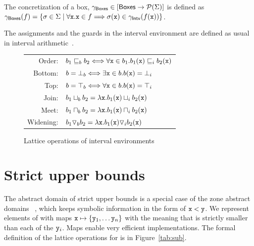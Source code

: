 \documentclass{elsart}
\begin{document}
The concretization of a box, $\gamma_{\mathsf{Boxes}} \in [\mathsf{Boxes} \rightarrow\mathcal{P}{(\Sigma)}]$ is defined as $\gamma_{\mathsf{Boxes}}(f) = \{ \sigma \in \Sigma \mid \forall \mathtt{x}. \mathtt{x} \in f \Longrightarrow \sigma(\mathtt{x}) \in \gamma_{\mathsf{Intv}}(f(\mathtt{x}))\}$.

The assignments and the guards in the interval environment are defined as usual in interval arithmetic~\cite{Cousot98}.

\begin{figure}
\small
\begin{tabular}{rl}
Order:& $ b_1 \sqsubseteq_b b_2 \Longleftrightarrow \forall \mathtt{x} \in b_1. b_1(\mathtt{x}) \sqsubseteq_i b_2(\mathtt{x})$ \\
Bottom:& $ b = {\bot}_b \Longleftrightarrow \exists \mathtt{x} \in b. b(\mathtt{x}) = {\bot}_i$ \\
Top:& $ b = {\top}_b \Longleftrightarrow \forall \mathtt{x} \in b. b(\mathtt{x}) = {\top}_i$\\
Join:& $ b_1 \sqcup_b b_2 = \lambda \mathtt{x}. b_1(\mathtt{x}) \sqcup_i b_2(\mathtt{x}) $ \\
Meet:& $ b_1 \sqcap_b b_2 = \lambda \mathtt{x}. b_1(\mathtt{x}) \sqcap_i b_2(\mathtt{x}) $  \\
Widening:&  $b_1 \triangledown_b b_2 = \lambda \mathtt{x}. b_1(\mathtt{x}) \triangledown_i b_2(\mathtt{x}) $
\end{tabular}
\caption{Lattice operations of interval environments}
\label{tab:boxes}
\end{figure}
 

\section{Strict upper bounds}
The abstract domain of strict upper bounds \SUB{} is a special case of
the zone abstract domains ~\cite{Mine02,GaubertEtAl07}, which keeps symbolic information in the form of $\mathtt{x} < \mathtt{y}$.
We represent elements of \SUB{} with maps $\mathtt{x} \mapsto \{ \mathtt{y}_1, \dots \mathtt{y}_n \}$ with the meaning that  is strictly smaller than each of the $\mathtt{y}_i$.
Maps enable very efficient implementations.
The formal definition of the lattice operations for \SUB{} is in Figure~\ref{tab:sub}.
\end{document}
